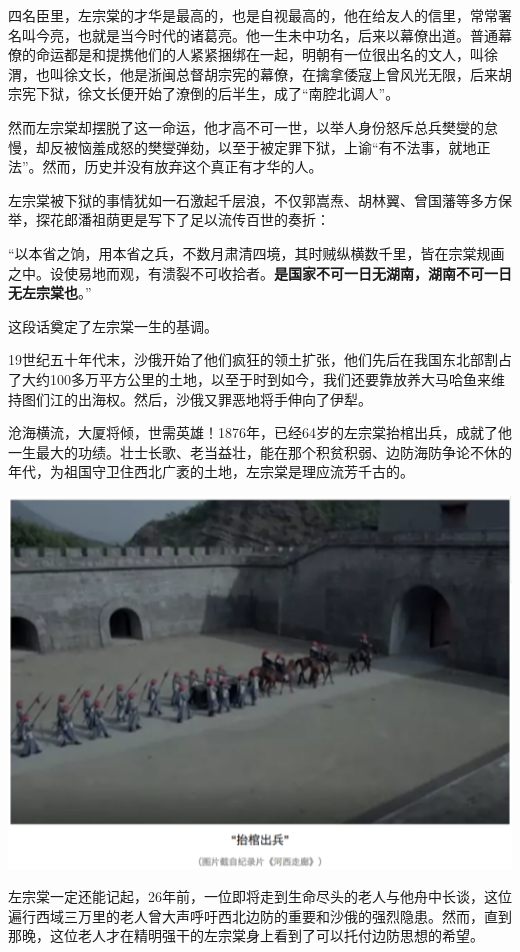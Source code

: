 \documentclass[]{book}
\begin{document}
四名臣里，左宗棠的才华是最高的，也是自视最高的，他在给友人的信里，常常署名叫今亮，也就是当今时代的诸葛亮。他一生未中功名，后来以幕僚出道。普通幕僚的命运都是和提携他们的人紧紧捆绑在一起，明朝有一位很出名的文人，叫徐渭，也叫徐文长，他是浙闽总督胡宗宪的幕僚，在擒拿倭寇上曾风光无限，后来胡宗宪下狱，徐文长便开始了潦倒的后半生，成了``南腔北调人''。

然而左宗棠却摆脱了这一命运，他才高不可一世，以举人身份怒斥总兵樊燮的怠慢，却反被恼羞成怒的樊燮弹劾，以至于被定罪下狱，上谕``有不法事，就地正法''。然而，历史并没有放弃这个真正有才华的人。

左宗棠被下狱的事情犹如一石激起千层浪，不仅郭嵩焘、胡林翼、曾国藩等多方保举，探花郎潘祖荫更是写下了足以流传百世的奏折：

``以本省之饷，用本省之兵，不数月肃清四境，其时贼纵横数千里，皆在宗棠规画之中。设使易地而观，有溃裂不可收拾者。\textbf{是国家不可一日无湖南，湖南不可一日无左宗棠也}。''

这段话奠定了左宗棠一生的基调。

19世纪五十年代末，沙俄开始了他们疯狂的领土扩张，他们先后在我国东北部割占了大约100多万平方公里的土地，以至于时到如今，我们还要靠放养大马哈鱼来维持图们江的出海权。然后，沙俄又罪恶地将手伸向了伊犁。

沧海横流，大厦将倾，世需英雄！1876年，已经64岁的左宗棠抬棺出兵，成就了他一生最大的功绩。壮士长歌、老当益壮，能在那个积贫积弱、边防海防争论不休的年代，为祖国守卫住西北广袤的土地，左宗棠是理应流芳千古的。

\includegraphics[width=6.67in]{images/his2}

左宗棠一定还能记起，26年前，一位即将走到生命尽头的老人与他舟中长谈，这位遍行西域三万里的老人曾大声呼吁西北边防的重要和沙俄的强烈隐患。然而，直到那晚，这位老人才在精明强干的左宗棠身上看到了可以托付边防思想的希望。
\end{document}
